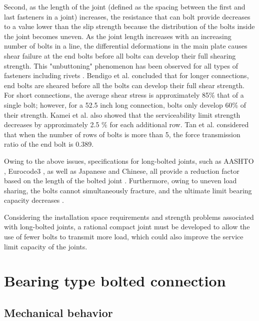 Second, as the length of the joint (defined as the spacing between the first and last fasteners in a joint) increases, the resistance that can bolt provide decreases to a value lower than the slip strength because the distribution of the bolts inside the joint becomes uneven. As the joint length increases with an increasing number of bolts in a line, the differential deformations in the main plate causes shear failure at the end bolts before all bolts can develop their full shearing strength. This "unbuttoning" phenomenon has been observed for all types of fasteners including rivets \cite{fisher1965behavior}. Bendigo et al.\cite{bendigo1963long} concluded that for longer connections, end bolts are sheared before all the bolts can develop their full shear strength. For short connections, the average shear stress is approximately 85\% that of a single bolt; however, for a 52.5 inch long connection, bolts only develop 60\% of their strength. Kamei et al. \cite{KAMEI2000} also showed that the serviceability limit strength decreases by approximately 2.5 $\%$ for each additional row.  Tan et al.\cite{Tan2022} considered that when the number of rows of bolts is more than 5, the force transmission ratio of the end bolt is 0.389.

Owing to the above issues, specifications for long-bolted joints, such as AASHTO \cite{AASHTO2020}, Eurocode3 \cite{eurocode3-21}, as well as Japanese and Chinese, all provide a reduction factor based on the length of the bolted joint \cite{eccs1985,isohtb,douji2017}. Furthermore, owing to uneven load sharing, the bolts cannot simultaneously fracture, and the ultimate limit bearing capacity decreases \cite{Takai2021BoltUnbuttoning,Peng2013FeaDimensions,peng2010,longstainless2022}. 

Considering the installation space requirements and strength problems associated with long-bolted joints, a rational compact joint must be developed to allow the use of fewer bolts to transmit more load, which could also improve the service limit capacity of the joints.

\section{Bearing type bolted connection} \label{secbc}

\subsection{Mechanical behavior}

